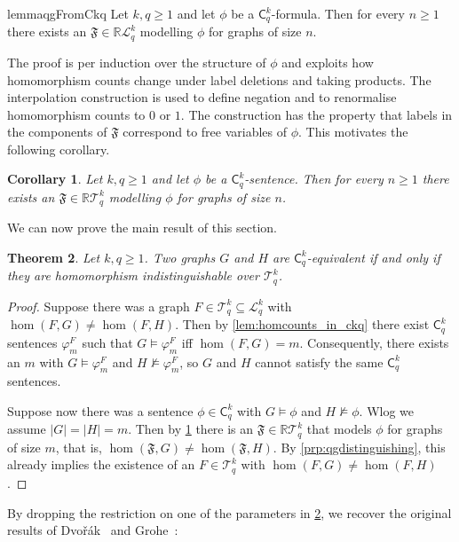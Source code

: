 \documentclass[10pt,a4paper]{article}
\newtheorem{theorem}{Theorem}
\newtheorem{corollary}[theorem]{Corollary}
\newcommand{\R}{\ensuremath{\mathbb{R}}}
\newcommand{\Ekq}{\ensuremath{\mathcal{T}_{q}^{k}}}
\newcommand{\Lkq}{\ensuremath{\mathcal{L}_{q}^{k}}}
\newcommand{\lC} {\ensuremath{\mathsf C}}
\newcommand{\qg}[1]{\ensuremath{\mathfrak{#1}}} \newcommand{\qgp}[3]{\ensuremath{\mathfrak{#1}[#3; #2]}}
\begin{document}
  \begin{restatable}{lemma}{qgFromCkq}
    \label{lem:qg_from_ckq}
  Let $k, q \geq 1$ and let $\phi$ be a $\lC^k_q$-formula. Then for every $n \geq 1$ there exists an $\qg{F} \in \R\Lkq$ modelling $\phi$ for graphs of size $n$.
\end{restatable}

The proof is per induction over the structure of $\phi$ and exploits how homomorphism counts change under label deletions and taking products. The interpolation construction is used to define negation and to renormalise homomorphism counts to $0$ or $1$. The construction has the property that labels in the components of $\qg{F}$ correspond to free variables of $\phi$. This motivates the following corollary.

\begin{corollary}\label{cor:qg_from_ckq}
  Let $k, q \geq 1$ and let $\phi$ be a $\lC^k_q$-sentence. Then for every $n \geq 1$ there exists an $\qg{F} \in \R\Ekq$ modelling $\phi$ for graphs of size $n$.
\end{corollary}


  We can now prove the main result of this section.


  \begin{theorem}\label{thm:ckq_equivalence}
    Let $k,q \geq 1$. 
    Two graphs $G$ and $H$ are $\lC^k_q$-equivalent if and only if they are homomorphism indistinguishable over $\Ekq$.
  \end{theorem}
  \begin{proof}
    Suppose there was a graph $F \in \Ekq \subseteq \Lkq$ with $\hom(F, G) \neq \hom(F, H)$. Then by \cref{lem:homcounts_in_ckq} there exist $\lC^k_q$ sentences $\varphi^F_m$ such that $G \models \varphi^F_m$ iff $\hom(F, G) = m$. Consequently, there exists an $m$ with $G \models \varphi^F_m$ and $H \not\models \varphi^F_m$, so $G$ and $H$ cannot satisfy the same $\lC^k_q$ sentences.

    Suppose now there was a sentence $\phi \in \lC^k_q$ with $G \models \phi$ and $H \not\models \phi$. Wlog we assume $|G| = |H| = m$. Then by \cref{cor:qg_from_ckq} there is an $\qg{F} \in \R\Ekq$ that models $\phi$ for graphs of size $m$, that is, $\hom(\qg{F}, G) \neq \hom(\qg{F}, H)$. By \cref{prp:qgdistinguishing}, this already implies the existence of an $F \in \Ekq$ with $\hom(F, G) \neq \hom(F, H)$.
  \end{proof}

  By dropping the restriction on one of the parameters in \cref{thm:ckq_equivalence}, we recover the original results of Dvo\v{r}\'ak~\cite{dvorak_recognizing_2010} and Grohe~\cite{grohe_counting_2020}:
\end{document}

